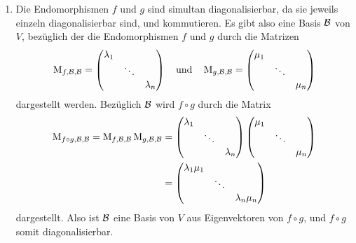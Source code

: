 \documentclass[a4paper, 10pt]{scrartcl}
\begin{document}
\begin{solution}
  \begin{enumerate}
    \item
      Die Endomorphismen $f$ und $g$ sind simultan diagonalisierbar, da sie jeweils einzeln diagonalisierbar sind, und kommutieren.
      Es gibt also eine Basis $\mathcal{B}$ von $V$, bezüglich der die Endomorphismen $f$ und $g$ durch die Matrizen
      \[
          \operatorname{M}_{f, \mathcal{B}, \mathcal{B}}
        = \begin{pmatrix}
            \lambda_1 &         &           \\
                      & \ddots  &           \\
                      &         & \lambda_n
          \end{pmatrix}
        \quad\text{und}\quad
          \operatorname{M}_{g, \mathcal{B}, \mathcal{B}}
        = \begin{pmatrix}
            \mu_1 &         &       \\
                  & \ddots  &       \\
                  &         & \mu_n
          \end{pmatrix}
      \]
      dargestellt werden.
      Bezüglich $\mathcal{B}$ wird $f \circ g$ durch die Matrix
      \begin{align*}
            \operatorname{M}_{f \circ g, \mathcal{B}, \mathcal{B}}
         =  \operatorname{M}_{f, \mathcal{B}, \mathcal{B}} \operatorname{M}_{g, \mathcal{B}, \mathcal{B}}
        &=  \begin{pmatrix}
              \lambda_1 &         &           \\
                        & \ddots  &           \\
                        &         & \lambda_n
            \end{pmatrix}
            \begin{pmatrix}
              \mu_1 &         &       \\
                    & \ddots  &       \\
                    &         & \mu_n
            \end{pmatrix}
        \\
        &=  \begin{pmatrix}
              \lambda_1 \mu_1 &         &                 \\
                              & \ddots  &                 \\
                              &         & \lambda_n \mu_n
            \end{pmatrix}
      \end{align*}
      dargestellt.
      Also ist $\mathcal{B}$ eine Basis von $V$ aus Eigenvektoren von $f \circ g$, und $f \circ g$ somit diagonalisierbar.
      

\end{enumerate}
\end{solution}
\end{document}
